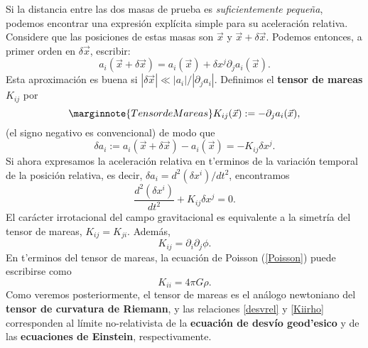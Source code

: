 Si la distancia entre las dos masas de prueba es \emph{suficientemente peque\~na}, podemos encontrar una expresión explícita simple para su aceleración relativa. Considere que las posiciones de estas masas son $\vec{x}$ y $\vec{x}+\delta\vec{x}$.
Podemos entonces, a primer orden en $\delta\vec{x}$, escribir:
\begin{equation}
a_i(\vec{x}+\delta\vec{x})=a_i(\vec{x})+\delta x^j\partial_j a_i(\vec{x}).
\end{equation}
Esta aproximación es buena si $|\delta\vec{x}|\ll |a_i|/|\partial_j
a_i|$. Definimos el \textbf{tensor de mareas} $K_{ij}$ por
\begin{equation}\marginnote{Tensor de Mareas}
K_{ij}(\vec{x}):=-\partial_j a_i(\vec{x}),
\end{equation}
(el signo negativo es convencional) de modo que
\begin{equation}
\delta a_i:=a_i(\vec{x}+\delta\vec{x})-a_i(\vec{x})=- K_{ij}\delta x^j.
\end{equation}
Si ahora expresamos la aceleración relativa en t'erminos de la variación temporal de la posición relativa, es decir, $\delta a_i=d^2(\delta x^i)/dt^2$, encontramos 
\begin{equation}\label{desvrel}
\frac{d^2(\delta x^i)}{dt^2}+K_{ij}\delta x^j=0.
\end{equation}
El carácter irrotacional del campo gravitacional es equivalente a la simetría
del tensor de mareas, $K_{ij}=K_{ji}$. Además,
\begin{equation}
K_{ij}=\partial_i\partial_j\phi.
\end{equation}
En t'erminos del tensor de mareas, la ecuación de Poisson (\ref{Poisson}) puede escribirse como
\begin{equation}\label{Kiirho}
K_{ii}=4\pi G\rho.
\end{equation}
Como veremos posteriormente, el tensor de mareas es el análogo newtoniano del \textbf{tensor de curvatura de Riemann}, y las relaciones \eqref{desvrel} y \eqref{Kiirho} corresponden al límite no-relativista de la \textbf{ecuación de desvío geod'esico} y de las \textbf{ecuaciones de Einstein}, respectivamente.



